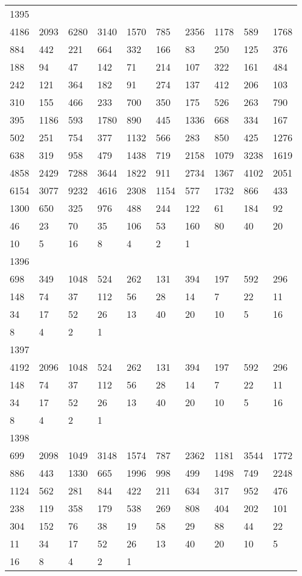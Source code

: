 \begin{longtable}{*{10}{l}}
1395&&&&&&&&&\\
4186& 2093& 6280& 3140& 1570& 785& 2356& 1178& 589& 1768\\
884& 442& 221& 664& 332& 166& 83& 250& 125& 376\\
188& 94& 47& 142& 71& 214& 107& 322& 161& 484\\
242& 121& 364& 182& 91& 274& 137& 412& 206& 103\\
310& 155& 466& 233& 700& 350& 175& 526& 263& 790\\
395& 1186& 593& 1780& 890& 445& 1336& 668& 334& 167\\
502& 251& 754& 377& 1132& 566& 283& 850& 425& 1276\\
638& 319& 958& 479& 1438& 719& 2158& 1079& 3238& 1619\\
4858& 2429& 7288& 3644& 1822& 911& 2734& 1367& 4102& 2051\\
6154& 3077& 9232& 4616& 2308& 1154& 577& 1732& 866& 433\\
1300& 650& 325& 976& 488& 244& 122& 61& 184& 92\\
46& 23& 70& 35& 106& 53& 160& 80& 40& 20\\
10& 5& 16& 8& 4& 2& 1& \\

1396&&&&&&&&&\\
698& 349& 1048& 524& 262& 131& 394& 197& 592& 296\\
148& 74& 37& 112& 56& 28& 14& 7& 22& 11\\
34& 17& 52& 26& 13& 40& 20& 10& 5& 16\\
8& 4& 2& 1& \\

1397&&&&&&&&&\\
4192& 2096& 1048& 524& 262& 131& 394& 197& 592& 296\\
148& 74& 37& 112& 56& 28& 14& 7& 22& 11\\
34& 17& 52& 26& 13& 40& 20& 10& 5& 16\\
8& 4& 2& 1& \\

1398&&&&&&&&&\\
699& 2098& 1049& 3148& 1574& 787& 2362& 1181& 3544& 1772\\
886& 443& 1330& 665& 1996& 998& 499& 1498& 749& 2248\\
1124& 562& 281& 844& 422& 211& 634& 317& 952& 476\\
238& 119& 358& 179& 538& 269& 808& 404& 202& 101\\
304& 152& 76& 38& 19& 58& 29& 88& 44& 22\\
11& 34& 17& 52& 26& 13& 40& 20& 10& 5\\
16& 8& 4& 2& 1& \\


\end{longtable}
